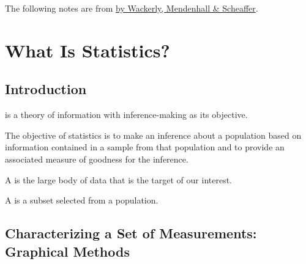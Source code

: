 The following notes are from \href{https://www.isbns.fm/isbn/9780495110811/}{ by Wackerly, Mendenhall \& Scheaffer}.

\section{What Is Statistics?}

\subsection{Introduction}

\begin{defn}
     is a theory of information with inference-making as its objective.
\end{defn}

\begin{rmrk}
    The objective of statistics is to make an inference about a population based on information contained in a sample from that population and to provide an associated measure of goodness for the inference.
\end{rmrk}

\begin{defn}
    A  is the large body of data that is the target of our interest.
\end{defn}

\begin{defn}
    A  is a subset selected from a population.
\end{defn}

\subsection{Characterizing a Set of Measurements: Graphical Methods}

